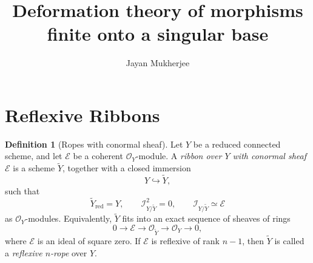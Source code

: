 \documentclass[11pt,twoside]{amsart}
\theoremstyle{plain}
\numberwithin{equation}{section}
\theoremstyle{definition}
\newtheorem{definition}[theorem]{Definition}
\begin{document}
\title[Deformation theory of morphisms finite onto a singular base ]{Deformation theory of morphisms finite onto a singular base}

\author[J. Mukherjee]{Jayan Mukherjee}
\address{Department of Mathematics, Oklahoma State University, Stillwater, USA}

\maketitle


\section{Reflexive Ribbons}

\begin{definition}[Ropes with conormal sheaf]
\label{def:ribbon-conormal-sheaf}
Let \(Y\) be a reduced connected scheme, and let \(\mathcal E\) be a coherent
\(\mathcal O_Y\)-module. A \emph{ribbon over \(Y\)
with conormal sheaf \(\mathcal E\)} is a scheme \(\widetilde Y\), together with a closed
immersion
\[
    Y\hookrightarrow \widetilde Y,
\]
such that
\[
    \widetilde Y_{\mathrm{red}}=Y,
    \qquad
    \mathcal I_{Y/\widetilde Y}^{2}=0,
    \qquad
    \mathcal I_{Y/\widetilde Y}\simeq \mathcal E
\]
as \(\mathcal O_Y\)-modules. Equivalently, \(\widetilde Y\) fits into an exact sequence of sheaves of rings
\[
    0\longrightarrow \mathcal E
    \longrightarrow \mathcal O_{\widetilde Y}
    \longrightarrow \mathcal O_Y
    \longrightarrow 0,
\]
where \(\mathcal E\) is an ideal of square zero. If \(\mathcal E\) is reflexive of rank \(n-1\), then $\widetilde{Y}$ is called a \emph{reflexive \(n\)-rope} over \(Y\).
\end{definition}
\end{document}
